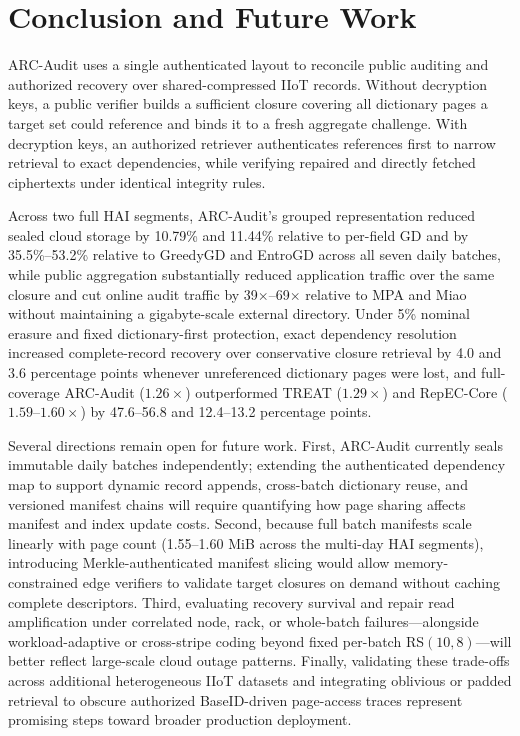 \documentclass[10pt,journal]{IEEEtran}
\begin{document}
\section{Conclusion and Future Work}
ARC-Audit uses a single authenticated layout to reconcile public auditing and authorized recovery over shared-compressed IIoT records. Without decryption keys, a public verifier builds a sufficient closure covering all dictionary pages a target set could reference and binds it to a fresh aggregate challenge. With decryption keys, an authorized retriever authenticates references first to narrow retrieval to exact dependencies, while verifying repaired and directly fetched ciphertexts under identical integrity rules.

Across two full HAI segments, ARC-Audit's grouped representation reduced sealed cloud storage by 10.79\% and 11.44\% relative to per-field GD and by 35.5\%--53.2\% relative to GreedyGD and EntroGD across all seven daily batches, while public aggregation substantially reduced application traffic over the same closure and cut online audit traffic by 39$\times$--69$\times$ relative to MPA and Miao without maintaining a gigabyte-scale external directory. Under 5\% nominal erasure and fixed dictionary-first protection, exact dependency resolution increased complete-record recovery over conservative closure retrieval by 4.0 and 3.6 percentage points whenever unreferenced dictionary pages were lost, and full-coverage ARC-Audit ($1.26\times$) outperformed TREAT ($1.29\times$) and RepEC-Core ($1.59$--$1.60\times$) by 47.6--56.8 and 12.4--13.2 percentage points.

Several directions remain open for future work. First, ARC-Audit currently seals immutable daily batches independently; extending the authenticated dependency map to support dynamic record appends, cross-batch dictionary reuse, and versioned manifest chains will require quantifying how page sharing affects manifest and index update costs. Second, because full batch manifests scale linearly with page count (1.55--1.60 MiB across the multi-day HAI segments), introducing Merkle-authenticated manifest slicing would allow memory-constrained edge verifiers to validate target closures on demand without caching complete descriptors. Third, evaluating recovery survival and repair read amplification under correlated node, rack, or whole-batch failures---alongside workload-adaptive or cross-stripe coding beyond fixed per-batch RS$(10,8)$---will better reflect large-scale cloud outage patterns. Finally, validating these trade-offs across additional heterogeneous IIoT datasets and integrating oblivious or padded retrieval to obscure authorized BaseID-driven page-access traces represent promising steps toward broader production deployment.



\end{document}

